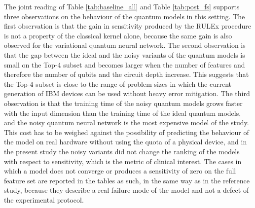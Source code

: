 The joint reading of Table \ref{tab:baseline_all} and Table \ref{tab:post_fs} supports three observations on the behaviour of the quantum models in this setting. The first observation is that the gain in sensitivity produced by the RULEx procedure is not a property of the classical kernel alone, because the same gain is also observed for the variational quantum neural network. The second observation is that the gap between the ideal and the noisy variants of the quantum models is small on the Top-4 subset and becomes larger when the number of features and therefore the number of qubits and the circuit depth increase. This suggests that the Top-4 subset is close to the range of problem sizes in which the current generation of IBM devices can be used without heavy error mitigation. The third observation is that the training time of the noisy quantum models grows faster with the input dimension than the training time of the ideal quantum models, and the noisy quantum neural network is the most expensive model of the study. This cost has to be weighed against the possibility of predicting the behaviour of the model on real hardware without using the quota of a physical device, and in the present study the noisy variants did not change the ranking of the models with respect to sensitivity, which is the metric of clinical interest. The cases in which a model does not converge or produces a sensitivity of zero on the full feature set are reported in the tables as such, in the same way as in the reference study, because they describe a real failure mode of the model and not a defect of the experimental protocol.
